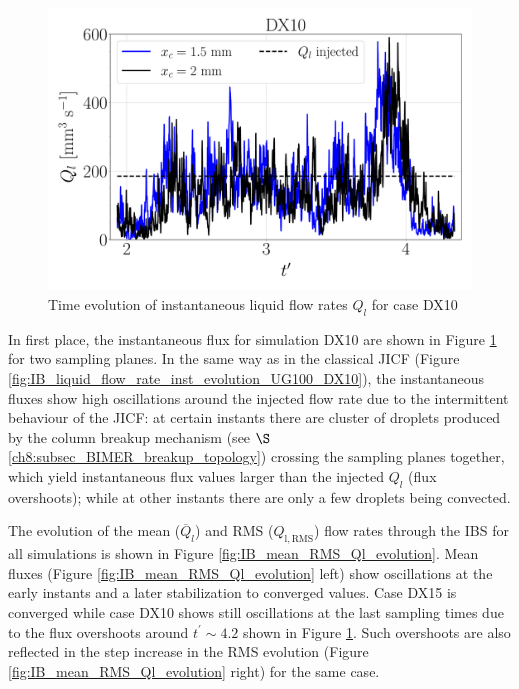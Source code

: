 \begin{figure}[ht]
	\centering
   \includegraphics[scale=0.222]{./part3_applications/figures_ch8_resolved/flow_rates_ibs/inst_Q_iso_x_DX10}
   \vspace*{-0.20in}
\caption{Time evolution of instantaneous liquid flow rates $Q_l$ for case DX10}
\label{fig:IB_liquid_flow_rate_inst_evolution_BIMER}
\end{figure}

\clearpage

In first place, the instantaneous flux for simulation DX10 are shown in Figure \ref{fig:IB_liquid_flow_rate_inst_evolution_BIMER} for two sampling planes. In the same way as in the classical JICF (Figure \ref{fig:IB_liquid_flow_rate_inst_evolution_UG100_DX10}), the instantaneous fluxes show high oscillations around the injected flow rate due to the intermittent behaviour of the JICF: at certain instants there are cluster of droplets produced by the column breakup mechanism (see $\S$\ref{ch8:subsec_BIMER_breakup_topology}) crossing the sampling planes together, which yield instantaneous flux values larger than the injected $Q_l$ (flux overshoots); while at other instants there are only a few droplets being convected.


The evolution of the mean ($\overline{Q}_l$) and RMS ($Q_\mathrm{l,\mathrm{RMS}}$) flow rates through the IBS for all simulations is shown in Figure \ref{fig:IB_mean_RMS_Ql_evolution}. Mean fluxes (Figure \ref{fig:IB_mean_RMS_Ql_evolution} left) show oscillations at the early instants and a later stabilization to converged values. Case DX15 is converged while case DX10 shows still oscillations at the last sampling times due to the flux overshoots around $t^\prime \sim 4.2$ shown in Figure \ref{fig:IB_liquid_flow_rate_inst_evolution_BIMER}. Such overshoots are also reflected in the step increase in the RMS evolution (Figure \ref{fig:IB_mean_RMS_Ql_evolution} right) for the same case. %

